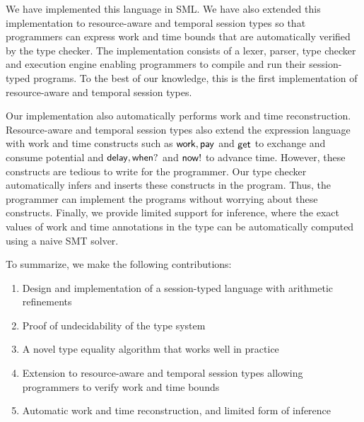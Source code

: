 We have implemented this language in SML. We have also extended this implementation
to resource-aware and temporal session types so that programmers can express
work and time bounds that are automatically verified by the type checker.
The implementation consists of a lexer, parser, type checker and execution
engine enabling programmers to compile and run their session-typed programs.
To the best of our knowledge, this is the first implementation of resource-aware
and temporal session types.

Our implementation also automatically performs work and time reconstruction.
Resource-aware and temporal session types also extend the expression language
with work and time constructs such as $\mathsf{work}, \mathsf{pay}$ and $\mathsf{get}$ to exchange
and consume potential and $\mathsf{delay}, \mathsf{when?}$ and $\mathsf{now!}$ to advance time.
However, these constructs are tedious to write for the programmer. Our type checker
automatically infers and inserts these constructs in the program. Thus, the
programmer can implement the programs without worrying about these constructs.
Finally, we provide limited support for inference, where the exact values of
work and time annotations in the type can be automatically computed using
a naive SMT solver.

To summarize, we make the following contributions:
\begin{enumerate}
  \item Design and implementation of a session-typed language with arithmetic
  refinements
  \item Proof of undecidability of the type system
  \item A novel type equality algorithm that works well in practice
  \item Extension to resource-aware and temporal session types allowing
  programmers to verify work and time bounds
  \item Automatic work and time reconstruction, and limited form of inference
\end{enumerate}